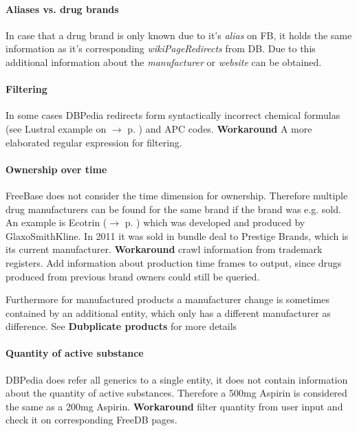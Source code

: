 \documentclass[11pt,titlepage,oneside,openany]{book}
\begin{document}
\paragraph{Aliases vs. drug brands}
\label{limitations:fb_drugs} 
In case that a drug brand is only known due to it's \textit{alias} on FB, it holds the same information as it's corresponding \textit{wikiPageRedirects} from DB. Due to this additional information about the \textit{manufacturer} or \textit{website} can be obtained.


\paragraph{Filtering}
\label{limitations:filtering}
In some cases DBPedia redirects form syntactically incorrect chemical formulas (see Lustral example on $\rightarrow$ p. \pageref{example:lustral}) and APC codes. \textbf{Workaround} A more elaborated regular expression for filtering.

\paragraph{Ownership over time}
FreeBase does not consider the time dimension for ownership. Therefore multiple drug manufacturers can be found for the same brand if the brand was e.g. sold. An example is Ecotrin ($\rightarrow$ p. \pageref{ex:ecotrin}) which was developed and produced by GlaxoSmithKline. In 2011 it was sold in bundle deal to Prestige Brands, which is its current manufacturer.
\textbf{Workaround} crawl information from trademark registers. Add information about production time frames to output, since drugs produced from previous brand owners could still be queried.

Furthermore for manufactured products a manufacturer change is sometimes contained by an additional entity, which only has a different manufacturer as difference. See \textbf{Dubplicate products} for more details

\paragraph{Quantity of active substance}
DBPedia does refer all generics to a single entity, it does not contain information about the quantity of active substances. Therefore a 500mg Aspirin is considered the same as a 200mg Aspirin.
\textbf{Workaround} filter quantity from user input and check it on corresponding FreeDB pages.
\end{document}
